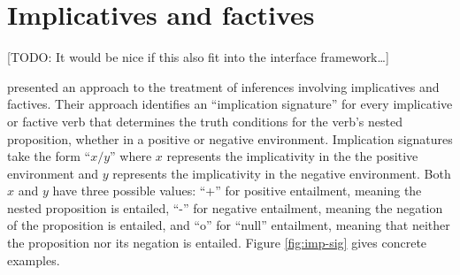 \section{Implicatives and factives}

[TODO: It would be nice if this also fit into the interface framework\ldots]

\citet{nairn:icos2006} presented an approach to the treatment of inferences
involving implicatives and factives.  Their approach identifies an ``implication
signature'' for every implicative or factive verb that determines the truth
conditions for the verb's nested proposition, whether in a positive or negative
environment.  Implication signatures take the form ``$x/y$'' where $x$
represents the implicativity in the the positive environment and $y$ represents
the implicativity in the negative environment.  Both $x$ and $y$ have three
possible values: ``+'' for positive entailment, meaning the nested proposition
is entailed, ``-'' for negative entailment, meaning the negation of the proposition
is entailed, and ``o'' for ``null'' entailment, meaning that neither the
proposition nor its negation is entailed. Figure \ref{fig:imp-sig} gives
concrete examples.%


